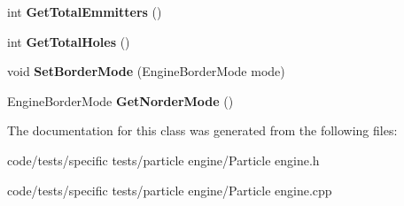 \begin{DoxyCompactItemize}
\item 
\hypertarget{classdl32_particle_system_a5ed311f984508327a1b266e93299be61}{int {\bfseries Get\-Total\-Emmitters} ()}\label{classdl32_particle_system_a5ed311f984508327a1b266e93299be61}

\item 
\hypertarget{classdl32_particle_system_a11fe7df4fff79add32eee06b3dee7104}{int {\bfseries Get\-Total\-Holes} ()}\label{classdl32_particle_system_a11fe7df4fff79add32eee06b3dee7104}

\item 
\hypertarget{classdl32_particle_system_a0e8d7c436e5521a2b47d0028bedc559d}{void {\bfseries Set\-Border\-Mode} (Engine\-Border\-Mode mode)}\label{classdl32_particle_system_a0e8d7c436e5521a2b47d0028bedc559d}

\item 
\hypertarget{classdl32_particle_system_a4c7d1aec59698d2b3aecb31235df8cf5}{Engine\-Border\-Mode {\bfseries Get\-Norder\-Mode} ()}\label{classdl32_particle_system_a4c7d1aec59698d2b3aecb31235df8cf5}

\end{DoxyCompactItemize}


The documentation for this class was generated from the following files\-:\begin{DoxyCompactItemize}
\item 
code/tests/specific tests/particle engine/Particle engine.\-h\item 
code/tests/specific tests/particle engine/Particle engine.\-cpp\end{DoxyCompactItemize}
